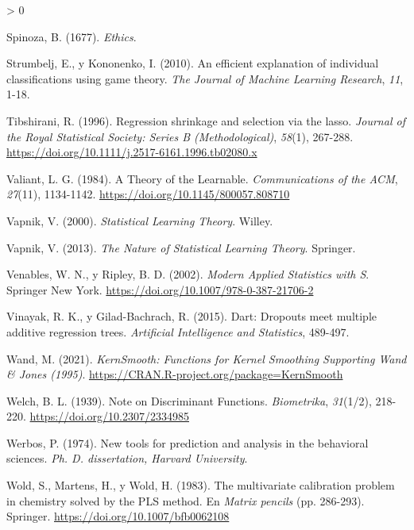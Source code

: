\documentclass[
  spanish,
]{book}
\theoremstyle{break}
\newlength{\cslhangindent}
\newenvironment{CSLReferences}[2] %
 {%
  \setlength{\parindent}{0pt}
  \ifodd #1 \everypar{\setlength{\hangindent}{\cslhangindent}}\ignorespaces\fi
  \ifnum #2 > 0
  \setlength{\parskip}{#2\baselineskip}
  \fi
 }%
 {}
\theoremstyle{definition}
\theoremstyle{definition}
\theoremstyle{definition}
\theoremstyle{definition}
\theoremstyle{remark}
\begin{document}
\begin{CSLReferences}{1}{0}
\leavevmode\hypertarget{ref-spinoza1667ethics}{}%
Spinoza, B. (1677). \emph{Ethics}.

\leavevmode\hypertarget{ref-strumbelj2010efficient}{}%
Strumbelj, E., y Kononenko, I. (2010). An efficient explanation of individual classifications using game theory. \emph{The Journal of Machine Learning Research}, \emph{11}, 1-18.

\leavevmode\hypertarget{ref-tibshirani1996regression}{}%
Tibshirani, R. (1996). Regression shrinkage and selection via the lasso. \emph{Journal of the Royal Statistical Society: Series B (Methodological)}, \emph{58}(1), 267-288. \url{https://doi.org/10.1111/j.2517-6161.1996.tb02080.x}

\leavevmode\hypertarget{ref-valiant1984theory}{}%
Valiant, L. G. (1984). A Theory of the Learnable. \emph{Communications of the ACM}, \emph{27}(11), 1134-1142. \url{https://doi.org/10.1145/800057.808710}

\leavevmode\hypertarget{ref-vapnik1998}{}%
Vapnik, V. (2000). \emph{Statistical Learning Theory}. Willey.

\leavevmode\hypertarget{ref-vapnik2013nature}{}%
Vapnik, V. (2013). \emph{The Nature of Statistical Learning Theory}. Springer.

\leavevmode\hypertarget{ref-Venables2002Modern}{}%
Venables, W. N., y Ripley, B. D. (2002). \emph{Modern Applied Statistics with S}. Springer New York. \url{https://doi.org/10.1007/978-0-387-21706-2}

\leavevmode\hypertarget{ref-vinayak2015dart}{}%
Vinayak, R. K., y Gilad-Bachrach, R. (2015). Dart: Dropouts meet multiple additive regression trees. \emph{Artificial Intelligence and Statistics}, 489-497.

\leavevmode\hypertarget{ref-R-KernSmooth}{}%
Wand, M. (2021). \emph{KernSmooth: Functions for Kernel Smoothing Supporting Wand \& Jones (1995)}. \url{https://CRAN.R-project.org/package=KernSmooth}

\leavevmode\hypertarget{ref-welch1939note}{}%
Welch, B. L. (1939). Note on Discriminant Functions. \emph{Biometrika}, \emph{31}(1/2), 218-220. \url{https://doi.org/10.2307/2334985}

\leavevmode\hypertarget{ref-werbos1974new}{}%
Werbos, P. (1974). New tools for prediction and analysis in the behavioral sciences. \emph{Ph. D. dissertation, Harvard University}.

\leavevmode\hypertarget{ref-wold1983multivariate}{}%
Wold, S., Martens, H., y Wold, H. (1983). The multivariate calibration problem in chemistry solved by the PLS method. En \emph{Matrix pencils} (pp. 286-293). Springer. \url{https://doi.org/10.1007/bfb0062108}


\end{CSLReferences}
\end{document}

